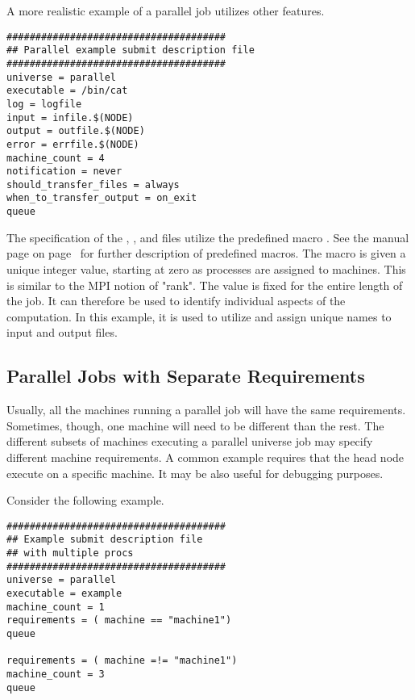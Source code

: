 A more realistic example of a parallel job utilizes other features.

\begin{verbatim}
######################################
## Parallel example submit description file
######################################
universe = parallel
executable = /bin/cat
log = logfile
input = infile.$(NODE)
output = outfile.$(NODE)
error = errfile.$(NODE)
machine_count = 4
notification = never
should_transfer_files = always
when_to_transfer_output = on_exit
queue
\end{verbatim}

The specification of the , ,
and  files utilize the predefined macro 
.
See the 
manual page on page~\pageref{man-condor-submit} for further
description of predefined macros.
The  macro is given a
unique integer value, starting at zero as processes are assigned to machines.
This is similar to the MPI notion of "rank".
The  value is fixed for the entire length of the job.
It can therefore be used to identify individual aspects of the computation.
In this example, it is used to utilize and assign unique names to
input and output files.

\subsection{\label{sec:parallel-multi-proc}Parallel Jobs with Separate Requirements}

Usually, all the machines running a parallel job will have the
same requirements.  Sometimes, though, one machine will need
to be different than the rest.  
The different subsets of machines executing a parallel universe job
may specify different machine requirements.  A common example requires that the
head node execute on a specific machine.  It may be also useful for debugging purposes.

Consider the following example.

\begin{verbatim}
######################################
## Example submit description file
## with multiple procs
######################################
universe = parallel
executable = example
machine_count = 1
requirements = ( machine == "machine1")
queue

requirements = ( machine =!= "machine1")
machine_count = 3
queue
\end{verbatim}

